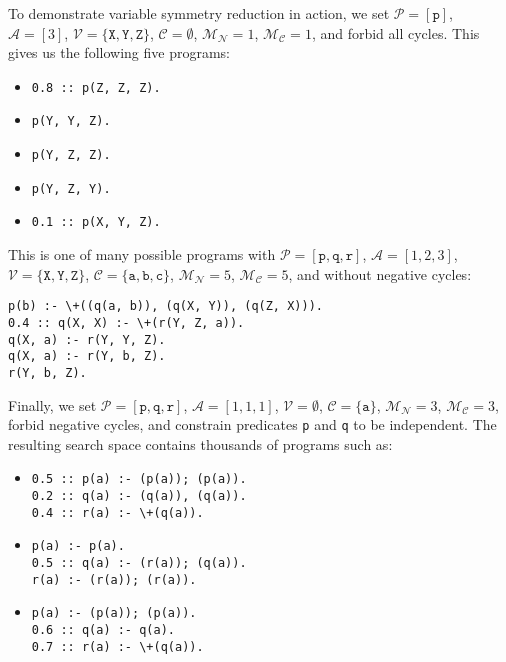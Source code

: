 \documentclass[letterpaper]{article}
\theoremstyle{definition}
\newcommand{\predicates}{\mathcal{P}}
\newcommand{\variables}{\mathcal{V}}
\newcommand{\constants}{\mathcal{C}}
\newcommand{\arities}{\mathcal{A}}
\newcommand{\maxNumNodes}{\mathcal{M}_{\mathcal{N}}}
\newcommand{\maxNumClauses}{\mathcal{M}_{\mathcal{C}}}
\begin{document}
To demonstrate variable symmetry reduction in action, we set $\predicates{} =
[\texttt{p}]$, $\arities{} = [3]$, $\variables{} = \{\texttt{X}, \texttt{Y},
\texttt{Z} \}$, $\constants{} = \emptyset$, $\maxNumNodes{} = 1$,
$\maxNumClauses{} = 1$, and forbid all cycles. This gives us the following five
programs:

\begin{itemize}
\item
\begin{verbatim}
0.8 :: p(Z, Z, Z).
\end{verbatim}
\item
\begin{verbatim}
p(Y, Y, Z).
\end{verbatim}
\item
\begin{verbatim}
p(Y, Z, Z).
\end{verbatim}
\item
\begin{verbatim}
p(Y, Z, Y).
\end{verbatim}
\item
\begin{verbatim}
0.1 :: p(X, Y, Z).
\end{verbatim}
\end{itemize}

This is one of many possible programs with $\predicates{} = [\texttt{p},
\texttt{q}, \texttt{r}]$, $\arities{} = [1, 2, 3]$, $\variables{} =
\{\texttt{X}, \texttt{Y}, \texttt{Z} \}$, $\constants{} = \{ \texttt{a},
\texttt{b}, \texttt{c} \}$, $\maxNumNodes{} = 5$, $\maxNumClauses{} = 5$, and
without negative cycles:

\begin{verbatim}
p(b) :- \+((q(a, b)), (q(X, Y)), (q(Z, X))).
0.4 :: q(X, X) :- \+(r(Y, Z, a)).
q(X, a) :- r(Y, Y, Z).
q(X, a) :- r(Y, b, Z).
r(Y, b, Z).
\end{verbatim}

Finally, we set
$\predicates{} = [\texttt{p}, \texttt{q}, \texttt{r}]$, $\arities{} = [1, 1,
1]$, $\variables{} = \emptyset$, $\constants{} = \{ \texttt{a} \}$,
$\maxNumNodes{} = 3$, $\maxNumClauses{} = 3$, forbid negative cycles, and
constrain predicates \texttt{p} and \texttt{q} to be independent. The resulting
search space contains thousands of programs such as:

\begin{itemize}
\item
\begin{verbatim}
0.5 :: p(a) :- (p(a)); (p(a)).
0.2 :: q(a) :- (q(a)), (q(a)).
0.4 :: r(a) :- \+(q(a)).
\end{verbatim}
\item
\begin{verbatim}
p(a) :- p(a).
0.5 :: q(a) :- (r(a)); (q(a)).
r(a) :- (r(a)); (r(a)).
\end{verbatim}
\item
\begin{verbatim}
p(a) :- (p(a)); (p(a)).
0.6 :: q(a) :- q(a).
0.7 :: r(a) :- \+(q(a)).
\end{verbatim}
\end{itemize}
\end{document}
